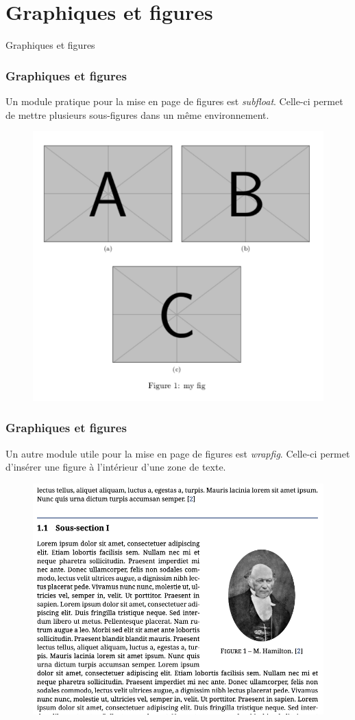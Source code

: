 
\section{Graphiques et figures}

\begin{frame}
    \vfill
    \begin{center}
        \large
        Graphiques et figures
    \end{center}
    \vfill
\end{frame}

\begin{frame}
    \frametitle{Graphiques et figures}
    Un module pratique pour la mise en page de figures est \textcolor{hard_green}{\textit{subfloat}}\footnotemark. Celle-ci permet de mettre plusieurs sous-figures dans un même environnement.
    \vfill
    \begin{figure}
        \centering
        \includegraphics[width=0.4\linewidth]{./figures/subfloat.png}
        \label{fig: subfloat}
    \end{figure}
\end{frame}

\begin{frame}
    \frametitle{Graphiques et figures}
    Un autre module utile pour la mise en page de figures est \textcolor{hard_green}{\textit{wrapfig}}\footnotemark. Celle-ci permet d'insérer une figure à l'intérieur d'une zone de texte.
    \vfill
    \begin{figure}
        \centering
        \includegraphics[width=0.45\linewidth]{./figures/wrapfig.png}
        \label{fig: wrapfig}
    \end{figure}
\end{frame}

